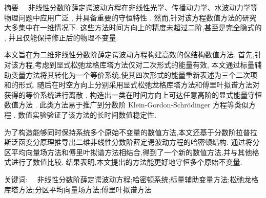 
\begin{ChineseAbstract}[副教授]%
\item {\heiti 摘要\ \ }
非线性分数阶薛定谔波动方程在非线性光学、传播动力学、水波动力学等物理问题中应用广泛 , 并具备重要的守恒特性 . 
然而,针对该方程数值方法的研究大多集中在一维情况下. 这些方法时间方向上的精度未超过二阶,甚至是完全隐式的 , 并且仅能保持修正后的物理不变量.

本文旨在为二维非线性分数阶薛定谔波动方程构建高效的保结构数值方法.  首先,针对该方程,考虑到显式松弛龙格库塔方法仅对二次形式的能量有效,
本文通过标量辅助变量方法将其转化为一个等价系统,使其四次形式的能量重新表述为三个二次项和的形式.
随后在时空方向上分别采用显式松弛龙格库塔方法和傅里叶拟谱方法对获得的等价系统进行离散 . 
构造出一类在时间方向上可达任意高阶的显式能量守恒数值方法 . 
此类方法易于推广到分数阶 Klein-Gordon-Schr{\"o}dinger 方程等类似方程 .
数值实验验证了该方法的长时间数值稳定性.

为了构造能够同时保持系统多个原始不变量的数值方法,本文还基于分数阶拉普拉斯泛函变分原理推导出二维非线性分数阶薛定谔波动方程的哈密顿结构.
通过将分区平均向量场方法和傅里叶拟谱方法相结合,得到了一个新的数值方法,并与其他格式进行了数值比较.
结果表明,本文提出的方法能更好地守恒多个原始不变量.

\item {\heiti 关键词:\ \ } 非线性分数阶薛定谔波动方程;\quad 哈密顿系统;\quad 标量辅助变量方法;\quad 松弛龙格库塔方法;\quad 分区平均向量场方法;\quad 傅里叶拟谱方法
\end{ChineseAbstract}
